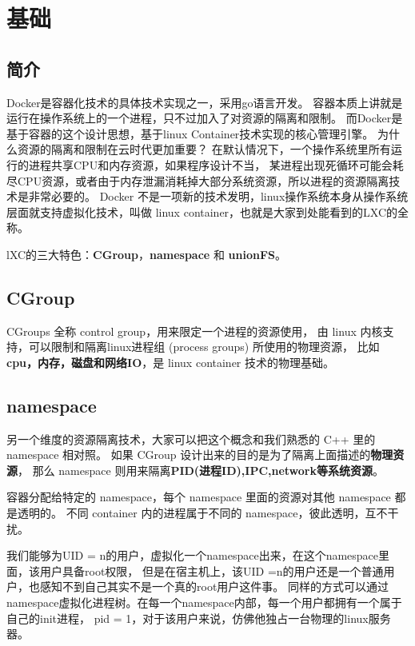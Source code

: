 \chapter{基础}
\newpage

\section{简介}

Docker是容器化技术的具体技术实现之一，采用go语言开发。
容器本质上讲就是运行在操作系统上的一个进程，只不过加入了对资源的隔离和限制。
而Docker是基于容器的这个设计思想，基于linux Container技术实现的核心管理引擎。
为什么资源的隔离和限制在云时代更加重要？
在默认情况下，一个操作系统里所有运行的进程共享CPU和内存资源，如果程序设计不当，
某进程出现死循环可能会耗尽CPU资源，或者由于内存泄漏消耗掉大部分系统资源，所以进程的资源隔离技术是非常必要的。
Docker 不是一项新的技术发明，linux操作系统本身从操作系统层面就支持虚拟化技术，叫做 linux container，也就是大家到处能看到的LXC的全称。

lXC的三大特色：\textbf{CGroup}，\textbf{namespace} 和 \textbf{unionFS}。

\section{CGroup}

CGroups 全称 control group，用来限定一个进程的资源使用，
由 linux 内核支持，可以限制和隔离linux进程组 (process groups) 所使用的物理资源，
比如\textbf{cpu，内存，磁盘和网络IO}，是 linux container 技术的物理基础。

\section{namespace}

另一个维度的资源隔离技术，大家可以把这个概念和我们熟悉的 C++ 里的 namespace 相对照。
如果 CGroup 设计出来的目的是为了隔离上面描述的\textbf{物理资源}，
那么 namespace 则用来隔离\textbf{PID(进程ID),IPC,network等系统资源}。

容器分配给特定的 namespace，每个 namespace 里面的资源对其他 namespace 都是透明的。
不同 container 内的进程属于不同的 namespace，彼此透明，互不干扰。

我们能够为UID = n的用户，虚拟化一个namespace出来，在这个namespace里面，该用户具备root权限，
但是在宿主机上，该UID =n的用户还是一个普通用户，也感知不到自己其实不是一个真的root用户这件事。
同样的方式可以通过namespace虚拟化进程树。在每一个namespace内部，每一个用户都拥有一个属于自己的init进程，
pid = 1，对于该用户来说，仿佛他独占一台物理的linux服务器。


